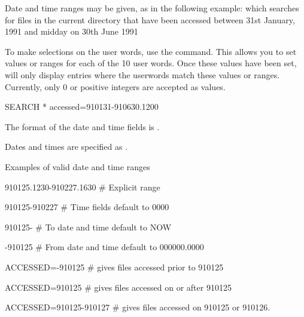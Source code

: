 Date and time ranges may be given, as in the following example:
which searches for files in the current directory that have been
accessed between 31st January, 1991 and midday on 30th June 1991

To make selections on the user words, use the  command.
This allows you to set values or ranges for each of the 10 user words.
Once these values have been set,  will only display entries
where the userwords match these values or ranges.
Currently, only 0 or positive integers are accepted as values.
\begin{XMP}
SEARCH * accessed=910131-910630.1200
\end{XMP}
The format of the date and time fields is 
.

Dates and times are specified as .
 
\begin{XMPt}{Examples of valid date and time ranges}

910125.1230-910227.1630   # Explicit range

910125-910227             # Time fields default to 0000

910125-                   # To date and time default to NOW

-910125                   # From date and time default to 000000.0000


ACCESSED=-910125          # gives files accessed prior to 910125

ACCESSED=910125           # gives files accessed on or after 910125 

ACCESSED=910125-910127    # gives files accessed on 910125 or 910126.
\end{XMPt}

